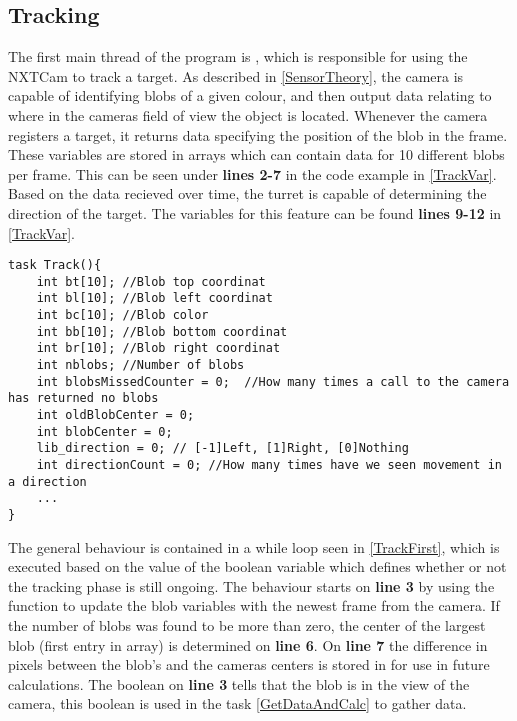 \subsection{Tracking}
The first main thread of the program is , which is responsible
for using the NXTCam to track a target. As described in \autoref{SensorTheory}, the camera
is capable of identifying blobs of a given colour, and then output data relating to where
in the cameras field of view the object is located. Whenever the camera
registers a target, it returns data specifying the position of the blob in the
frame. These variables are stored in arrays which can contain data for 10
different blobs per frame. This can be seen under \textbf{lines 2-7} in the code
example in \autoref{TrackVar}. Based on the data recieved over time, the turret
is capable of determining the direction of the target. The variables
for this feature can be found \textbf{lines 9-12} in \autoref{TrackVar}.\nl
 
\begin{minipage}[H]{\linewidth}
\begin{lstlisting}[caption = Variables used on the Track() thread., label = TrackVar] 
task Track(){
    int bt[10]; //Blob top coordinat
    int bl[10]; //Blob left coordinat
    int bc[10]; //Blob color
    int bb[10]; //Blob bottom coordinat
    int br[10]; //Blob right coordinat
    int nblobs; //Number of blobs
    int blobsMissedCounter = 0;  //How many times a call to the camera has returned no blobs
    int oldBlobCenter = 0;
    int blobCenter = 0;
    lib_direction = 0; // [-1]Left, [1]Right, [0]Nothing
    int directionCount = 0; //How many times have we seen movement in a direction
    ...
}
\end{lstlisting}
\end{minipage}

The general behaviour is contained in a while loop seen in \autoref{TrackFirst},
which is executed based on the value of the boolean variable
 which defines whether or not the tracking phase is still
ongoing. The behaviour starts on \textbf{line 3} by using the
 function to update the blob variables with
the newest frame from the camera. If the number of blobs was found to be more
than zero, the center of the largest blob (first entry in array) is determined on
\textbf{line 6}. On \textbf{line 7} the difference in pixels between the blob's
and the cameras centers is stored in  for use in future
calculations. The boolean on \textbf{line 3} tells that the blob is in the view
of the camera, this boolean is used in the  task
\autoref{GetDataAndCalc} to gather data.\nl
  
